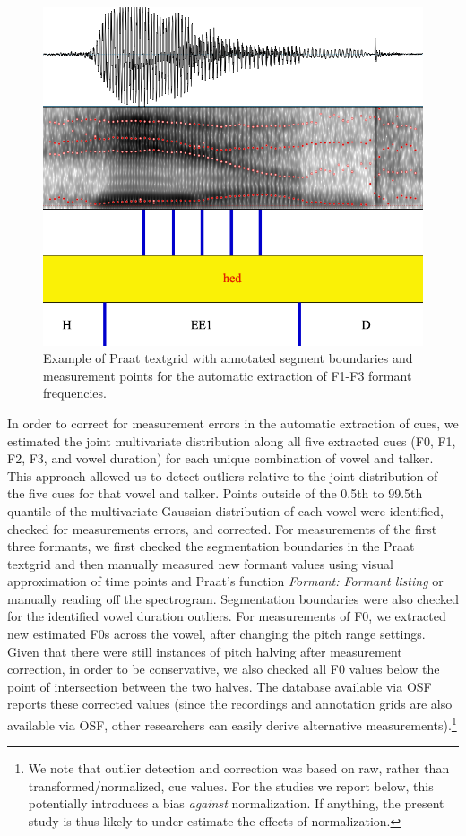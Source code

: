 \documentclass[utf8]{frontiersSCNS}
\begin{document}
\begin{figure}

{\centering \includegraphics[width=0.4\linewidth]{spectrogram} 

}

\caption{Example of Praat textgrid with annotated segment boundaries and measurement points for the automatic extraction of F1-F3 formant frequencies.}\label{fig:spectrogram}
\end{figure}

In order to correct for measurement errors in the automatic extraction of cues, we estimated the joint multivariate distribution along all five extracted cues (F0, F1, F2, F3, and vowel duration) for each unique combination of vowel and talker. This approach allowed us to detect outliers relative to the joint distribution of the five cues for that vowel and talker. Points outside of the 0.5th to 99.5th quantile of the multivariate Gaussian distribution of each vowel were identified, checked for measurements errors, and corrected. For measurements of the first three formants, we first checked the segmentation boundaries in the Praat textgrid and then manually measured new formant values using visual approximation of time points and Praat's function \emph{Formant: Formant listing} or manually reading off the spectrogram. Segmentation boundaries were also checked for the identified vowel duration outliers. For measurements of F0, we extracted new estimated F0s across the vowel, after changing the pitch range settings. Given that there were still instances of pitch halving after measurement correction, in order to be conservative, we also checked all F0 values below the point of intersection between the two halves. The database available via OSF reports these corrected values (since the recordings and annotation grids are also available via OSF, other researchers can easily derive alternative measurements).\footnote{We note that outlier detection and correction was based on raw, rather than transformed/normalized, cue values. For the studies we report below, this potentially introduces a bias \emph{against} normalization. If anything, the present study is thus likely to under-estimate the effects of normalization.}
\end{document}
